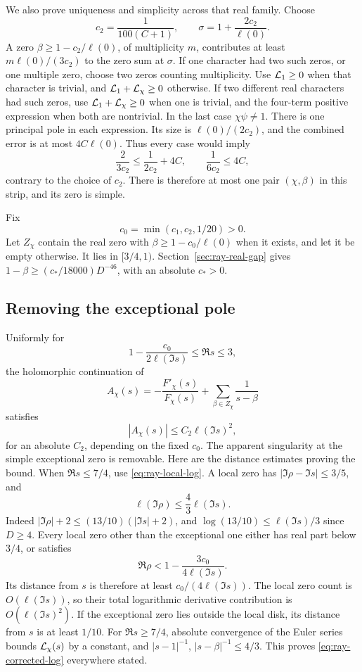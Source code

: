 We also prove uniqueness and simplicity across that real family.
Choose
\[
                 c_2=\frac1{100(C+1)},\qquad
                    \sigma=1+\frac{2c_2}{\ell(0)}.
\]
A zero \(\beta\geq1-c_2/\ell(0)\), of multiplicity \(m\), contributes
at least \(m\ell(0)/(3c_2)\) to the zero sum at \(\sigma\).
If one character had two such zeros, or one multiple zero, choose
two zeros counting multiplicity.
Use \({\cal L}_1\geq0\) when that character is trivial, and
\({\cal L}_1+{\cal L}_\chi\geq0\) otherwise.
If two different real characters had such zeros, use
\({\cal L}_1+{\cal L}_\chi\geq0\) when one is trivial, and the
four-term positive expression when both are nontrivial.
In the last case \(\chi\psi\ne1\).
There is one principal pole in each expression. Its size is
\(\ell(0)/(2c_2)\), and the combined error is at most \(4C\ell(0)\).
Thus every case would imply
\[
             \frac{2}{3c_2}\leq\frac1{2c_2}+4C,
                         \qquad \frac1{6c_2}\leq4C ,
\]
contrary to the choice of \(c_2\).
There is therefore at most one pair \((\chi,\beta)\) in this
strip, and its zero is simple.

Fix
\[
                    c_0=\min(c_1,c_2,1/20)>0 .
\]
Let \(Z_\chi\) contain the real zero with
\(\beta\geq1-c_0/\ell(0)\) when it exists, and let it be empty
otherwise.
It lies in \([3/4,1)\).
Section~\ref{sec:ray-real-gap} gives
\(1-\beta\geq(c_*/18000)D^{-46}\), with an absolute \(c_*>0\).

\subsection{Removing the exceptional pole}

Uniformly for
\[
       1-\frac{c_0}{2\ell(\Im s)}\leq\Re s\leq3 ,
\]
the holomorphic continuation of
\[
     A_\chi(s)=-\frac{F'_\chi(s)}{F_\chi(s)}
                           +\sum_{\beta\in Z_\chi}\frac1{s-\beta}
\]
satisfies
\begin{equation}
 \label{eq:ray-corrected-log}
                         |A_\chi(s)|\leq C_2\ell(\Im s)^2 ,
\end{equation}
for an absolute \(C_2\), depending on the fixed \(c_0\).
The apparent singularity at the simple exceptional zero is removable.
Here are the distance estimates proving the bound.
When \(\Re s\leq7/4\), use \eqref{eq:ray-local-log}.
A local zero has \(|\Im\rho-\Im s|\leq3/5\), and
\[
       \ell(\Im\rho)\leq\frac43\ell(\Im s).
\]
Indeed
\(|\Im\rho|+2\leq(13/10)(|\Im s|+2)\), and
\(\log(13/10)\leq\ell(\Im s)/3\) since \(D\geq4\).
Every local zero other than the exceptional one either has real
part below \(3/4\), or satisfies
\[
        \Re\rho<1-\frac{3c_0}{4\ell(\Im s)}.
\]
Its distance from \(s\) is therefore at least
\(c_0/(4\ell(\Im s))\).
The local zero count is \(O(\ell(\Im s))\), so their total
logarithmic derivative contribution is \(O(\ell(\Im s)^2)\).
If the exceptional zero lies outside the local disk, its distance
from \(s\) is at least \(1/10\).
For \(\Re s\geq7/4\), absolute convergence of the Euler series
bounds \({\cal L}_\chi(s)\) by a constant, and
\(|s-1|^{-1}\), \(|s-\beta|^{-1}\leq4/3\).
This proves \eqref{eq:ray-corrected-log} everywhere stated.


